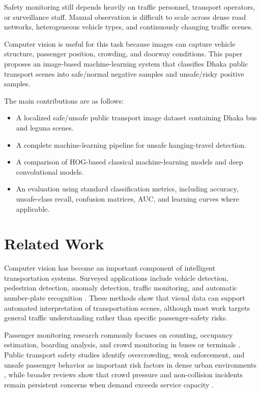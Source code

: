 \documentclass[conference]{IEEEtran}
\begin{document}
Safety monitoring still depends heavily on traffic personnel, transport operators, or surveillance staff. Manual observation is difficult to scale across dense road networks, heterogeneous vehicle types, and continuously changing traffic scenes.

Computer vision is useful for this task because images can capture vehicle structure, passenger position, crowding, and doorway conditions. This paper proposes an image-based machine-learning system that classifies Dhaka public transport scenes into safe/normal negative samples and unsafe/risky positive samples.

The main contributions are as follows:
\begin{itemize}
    \item A localized safe/unsafe public transport image dataset containing Dhaka bus and leguna scenes.
    \item A complete machine-learning pipeline for unsafe hanging-travel detection.
    \item A comparison of HOG-based classical machine-learning models and deep convolutional models.
    \item An evaluation using standard classification metrics, including accuracy, unsafe-class recall, confusion matrices, AUC, and learning curves where applicable.
\end{itemize}

\section{Related Work}
Computer vision has become an important component of intelligent transportation systems. Surveyed applications include vehicle detection, pedestrian detection, anomaly detection, traffic monitoring, and automatic number-plate recognition \cite{dilek2023cvits}. These methods show that visual data can support automated interpretation of transportation scenes, although most work targets general traffic understanding rather than specific passenger-safety risks.

Passenger monitoring research commonly focuses on counting, occupancy estimation, boarding analysis, and crowd monitoring in buses or terminals \cite{hsu2020passenger}. Public transport safety studies identify overcrowding, weak enforcement, and unsafe passenger behavior as important risk factors in dense urban environments \cite{hossain2018bus}, while broader reviews show that crowd pressure and non-collision incidents remain persistent concerns when demand exceeds service capacity \cite{crowding2023review}.
\end{document}
